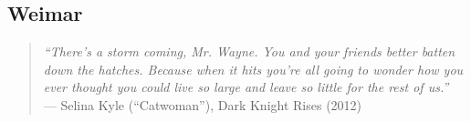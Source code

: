 


\subsection[Weimar]{Weimar}



\begin{quote}
	\emph{``There’s a storm coming, Mr. Wayne. You and your friends better batten down the hatches. Because when it hits you’re all going to wonder how you ever thought you could live so large and leave so little for the rest of us.''}\\
	--- Selina Kyle (``Catwoman''), Dark Knight Rises (2012)
\end{quote}

